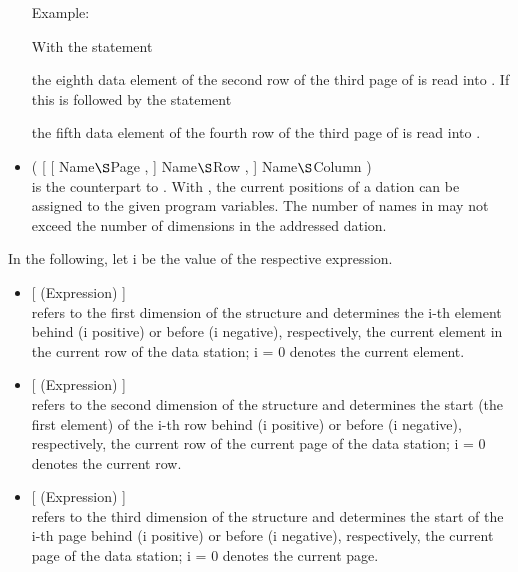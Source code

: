 \begin{itemize}
Example:

With the statement


the eighth data element of the second row of the third page of  is
read into . If this is followed by the statement


the fifth data element of the fourth row of the third page of  is
read into .
\item {} ( [ [ Name$\S $Page , ] Name$\S $Row , ] Name$\S $Column )\\
is the counterpart to . With , the current positions of a dation
can be assigned to the given program variables. The number of names in
 may not exceed the number of dimensions in the addressed dation.
\end{itemize}

In the following, let i be the value of the respective expression.
\begin{itemize}
\item {} [ (Expression) ]\\
refers to the first dimension of the structure and determines the i-th
element behind (i positive) or before (i negative), respectively, the
current element in the current row of the data station; i = 0 denotes
the current element.
\item {} [ (Expression) ]\\
refers to the second dimension of the structure and determines the start
(the first element) of the i-th row behind (i positive) or before (i
negative), respectively, the current row of the current page of the data
station; i = 0 denotes the current row.
\item {} [ (Expression) ]\\
refers to the third dimension of the structure and determines the start
of the i-th page behind (i positive) or before (i negative),
respectively, the current page of the data station; i = 0 denotes the
current page.
\end{itemize}

